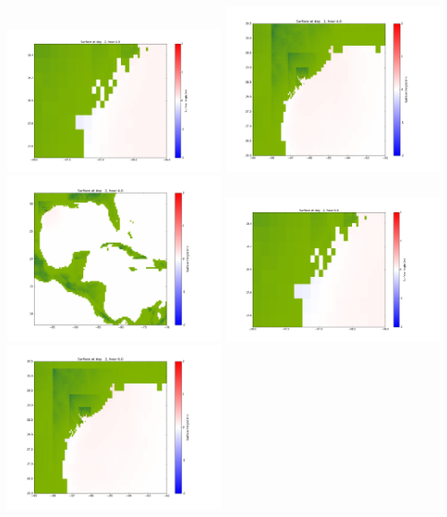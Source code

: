 \documentclass[11pt]{article}
\begin{document}
\vskip 10pt 
\includegraphics[width=0.475\textwidth]{frame0050fig1001.png}
\includegraphics[width=0.475\textwidth]{frame0050fig1002.png}
\vskip 10pt 
\includegraphics[width=0.475\textwidth]{frame0050fig1003.png}
\vskip 10pt 
\includegraphics[width=0.475\textwidth]{frame0051fig1001.png}
\includegraphics[width=0.475\textwidth]{frame0051fig1002.png}
\end{document}
